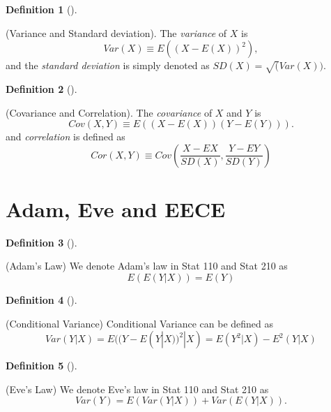 \documentclass[
  letterpaper,
  DIV=11,
  numbers=noendperiod]{scrreprt}
\theoremstyle{definition}
\newtheorem{definition}{Definition}[chapter]
\theoremstyle{plain}
\theoremstyle{remark}
\begin{document}

\leavevmode{}%
\begin{definition}[]\label{def-variance-std}

(Variance and Standard deviation). The \emph{variance} of \(X\) is
\[Var(X)\equiv E((X-E(X))^2),\] and the \emph{standard deviation} is
simply denoted as \(SD(X)=\sqrt(Var(X))\).

\end{definition}

\leavevmode{}%
\begin{definition}[]\label{def-cov-corr}

(Covariance and Correlation). The \emph{covariance} of \(X\) and \(Y\)
is \[Cov(X,Y)\equiv E((X-E(X))(Y-E(Y))).\] and \emph{correlation} is
defined as
\[Cor(X,Y)\equiv Cov \left( \frac{X-EX}{SD(X)},\frac{Y-EY}{SD(Y)} \right)\]

\end{definition}

\hypertarget{adam-eve-and-eece}{%
\section*{Adam, Eve and EECE}\label{adam-eve-and-eece}}


\leavevmode{}%
\begin{definition}[]\label{def-adam}

(Adam's Law) We denote Adam's law in Stat 110 and Stat 210 as
\[E(E(Y|X))=E(Y)\]

\end{definition}

\leavevmode{}%
\begin{definition}[]\label{def-conditional-variance}

(Conditional Variance) Conditional Variance can be defined as
\[Var(Y|X)=E((Y-E(Y|X))^2|X)=E(Y^2|X)-E^2(Y|X)\]

\end{definition}

\leavevmode{}%
\begin{definition}[]\label{def-eve}

(Eve's Law) We denote Eve's law in Stat 110 and Stat 210 as
\[Var(Y)=E(Var(Y|X))+Var(E(Y|X)).\]

\end{definition}
\end{document}
